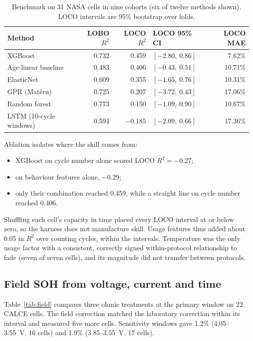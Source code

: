 \documentclass[preprint,12pt,authoryear]{elsarticle}
\begin{document}
\begin{table}[t]
\centering
\caption{Benchmark on 31 NASA cells in nine cohorts (six of twelve methods shown).
LOCO intervals are 95\% bootstrap over folds.}
\label{tab:bench}
\begin{tabular}{lrrlr}
\toprule
Method & LOBO $R^2$ & LOCO $R^2$ & LOCO 95\% CI & LOCO MAE \\
\midrule
XGBoost & 0.732 & 0.459 & $[-2.80,\ 0.86]$ & 7.62\% \\
Age-linear baseline & 0.483 & 0.406 & $[-0.43,\ 0.51]$ & 10.71\% \\
ElasticNet & 0.609 & 0.355 & $[-1.65,\ 0.76]$ & 10.31\% \\
GPR (Mat\'ern) & 0.725 & 0.207 & $[-3.72,\ 0.43]$ & 17.06\% \\
Random forest & 0.773 & 0.150 & $[-1.09,\ 0.90]$ & 10.67\% \\
LSTM (10-cycle windows) & 0.594 & $-0.185$ & $[-2.09,\ 0.66]$ & 17.36\% \\
\bottomrule
\end{tabular}
\end{table}

Ablation isolates where the skill comes from:
\begin{itemize}
\item XGBoost on cycle number alone scored LOCO $R^2 = -0.27$;
\item on behaviour features alone, $-0.29$;
\item only their combination reached 0.459, while a straight line on cycle
number reached 0.406.
\end{itemize}
Shuffling each cell's capacity in time placed every LOCO interval at or below
zero, so the harness does not manufacture skill. Usage features thus added
about 0.05 in $R^2$ over counting cycles, within the intervals. Temperature was
the only usage factor with a consistent, correctly signed within-protocol
relationship to fade (seven of seven cells), and its magnitude did not transfer
between protocols.

\subsection{Field SOH from voltage, current and time}
\label{sec:res-field}

Table~\ref{tab:field} compares three ohmic treatments at the primary window on
22 CALCE cells. The field correction matched the laboratory correction within
its interval and measured five more cells. Sensitivity windows gave 1.2\%
(4.05--3.55~V, 16 cells) and 1.9\% (3.85--3.55~V, 17 cells).
\end{document}
